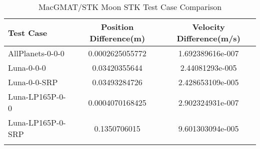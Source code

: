 \begin{table}[htbp!]
\centering
\caption{ MacGMAT/STK Moon STK Test Case Comparison}
      \begin{tabular}{lcc}
      \hline\hline
          Test Case & Position Difference(m) & Velocity Difference(m/s) \\
         \hline
         AllPlanets-0-0-0 & 0.0002625055772 & 1.692389616e-007 \\
         Luna-0-0-0 & 0.03420355644 & 2.44081293e-005 \\
         Luna-0-0-SRP & 0.03493284726 & 2.428653109e-005 \\
         Luna-LP165P-0-0 & 0.0004070168425 & 2.902324931e-007 \\
         Luna-LP165P-0-SRP & 0.1350706015 & 9.601303094e-005 \\
      \hline\hline
      \label{Table: Moon STK Table} 
\end{tabular}
\end{table}
